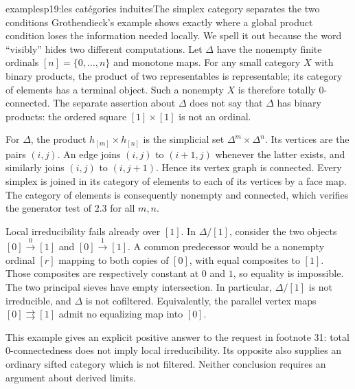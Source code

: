 \begin{dcomment}{examples}{p19:les catégories induites}{The simplex category separates the two conditions}
Grothendieck's example shows exactly where a global product condition loses the information needed locally. We spell it out because the word ``visibly'' hides two different computations. Let $\Delta$ have the nonempty finite ordinals $[n]=\{0,\ldots,n\}$ and monotone maps. For any small category $X$ with binary products, the product of two representables is representable; its category of elements has a terminal object. Such a nonempty $X$ is therefore totally $0$-connected. The separate assertion about $\Delta$ does not say that $\Delta$ has binary products: the ordered square $[1]\times[1]$ is not an ordinal.

For $\Delta$, the product $h_{[m]}\times h_{[n]}$ is the simplicial set $\Delta^m\times\Delta^n$. Its vertices are the pairs $(i,j)$. An edge joins $(i,j)$ to $(i+1,j)$ whenever the latter exists, and similarly joins $(i,j)$ to $(i,j+1)$. Hence its vertex graph is connected. Every simplex is joined in its category of elements to each of its vertices by a face map. The category of elements is consequently nonempty and connected, which verifies the generator test of 2.3 for all $m,n$.

Local irreducibility fails already over $[1]$. In $\Delta/[1]$, consider the two objects $[0]\xrightarrow{0}[1]$ and $[0]\xrightarrow{1}[1]$. A common predecessor would be a nonempty ordinal $[r]$ mapping to both copies of $[0]$, with equal composites to $[1]$. Those composites are respectively constant at $0$ and $1$, so equality is impossible. The two principal sieves have empty intersection. In particular, $\Delta/[1]$ is not irreducible, and $\Delta$ is not cofiltered. Equivalently, the parallel vertex maps $[0]\rightrightarrows[1]$ admit no equalizing map into $[0]$.

This example gives an explicit positive answer to the request in footnote 31: total $0$-connectedness does not imply local irreducibility. Its opposite also supplies an ordinary sifted category which is not filtered. Neither conclusion requires an argument about derived limits.
\end{dcomment}

